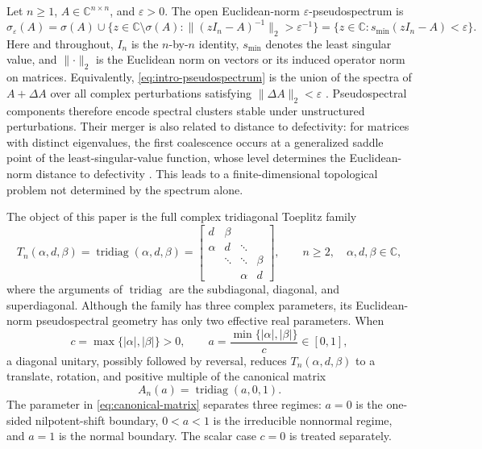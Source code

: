 \documentclass[10pt,twoside]{siamart1116}
\numberwithin{equation}{section}
\DeclareMathOperator{\tridiag}{tridiag}
\newcommand{\C}{\mathbb C}
\begin{document}
Let \(n\geq1\), \(A\in\C^{n\times n}\), and \(\varepsilon>0\).  The open
Euclidean-norm \(\varepsilon\)-pseudospectrum is
\begin{equation}\label{eq:intro-pseudospectrum}
 \sigma_\varepsilon(A)
 =\sigma(A)\cup
 \{z\in\C\setminus\sigma(A):
   \lVert(zI_n-A)^{-1}\rVert_2>\varepsilon^{-1}\}
 =\{z\in\C:s_{\min}(zI_n-A)<\varepsilon\}.
\end{equation}
Here and throughout, \(I_n\) is the \(n\)-by-\(n\) identity,
\(s_{\min}\) denotes the least singular value, and \(\lVert\cdot\rVert_2\)
is the Euclidean norm on vectors or its induced operator norm on matrices.
Equivalently, \eqref{eq:intro-pseudospectrum} is the union of the spectra of
\(A+\Delta A\) over all complex perturbations satisfying
\(\lVert\Delta A\rVert_2<\varepsilon\)
\cite{TrefethenEmbree2005}.  Pseudospectral components therefore encode
spectral clusters stable under unstructured perturbations.  Their merger is
also related to distance to defectivity: for matrices with distinct
eigenvalues, the first coalescence occurs at a generalized saddle point of
the least-singular-value function, whose level determines the Euclidean-norm
distance to defectivity \cite{AlamEtAl2011}.  This leads to a
finite-dimensional topological problem not determined by the spectrum alone.

The object of this paper is the full complex tridiagonal Toeplitz family
\begin{equation}\label{eq:A-matrix}
 T_n(\alpha,d,\beta)=\tridiag(\alpha,d,\beta)
 =\begin{bmatrix}
 d&\beta\\
 \alpha&d&\ddots\\
 &\ddots&\ddots&\beta\\
 &&\alpha&d
 \end{bmatrix},
 \qquad n\geq2,\quad \alpha,d,\beta\in\C,
\end{equation}
where the arguments of \(\tridiag\) are the subdiagonal, diagonal, and
superdiagonal.  Although the family has three complex parameters, its
Euclidean-norm pseudospectral geometry has only two effective real parameters.
When
\[
 c=\max\{|\alpha|,|\beta|\}>0,
 \qquad a=\frac{\min\{|\alpha|,|\beta|\}}{c}\in[0,1],
\]
a diagonal unitary, possibly followed by reversal, reduces
\(T_n(\alpha,d,\beta)\) to a translate, rotation, and positive multiple of
the canonical matrix
\begin{equation}\label{eq:canonical-matrix}
 A_n(a)=\tridiag(a,0,1).
\end{equation}
The parameter in \eqref{eq:canonical-matrix} separates three regimes:
\(a=0\) is the one-sided nilpotent-shift boundary, \(0<a<1\) is the
irreducible nonnormal regime, and \(a=1\) is the normal boundary.  The scalar
case \(c=0\) is treated separately.
\end{document}

